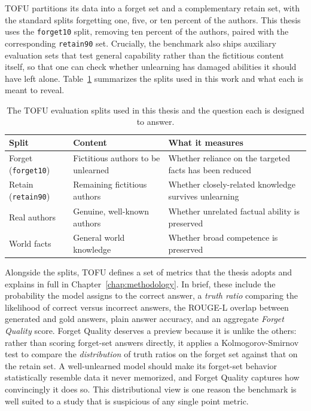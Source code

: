 \documentclass[a4paper,12pt]{report}
\begin{document}
TOFU partitions its data into a forget set and a complementary retain set, with the standard splits forgetting one, five, or ten percent of the authors. This thesis uses the \texttt{forget10} split, removing ten percent of the authors, paired with the corresponding \texttt{retain90} set. Crucially, the benchmark also ships auxiliary evaluation sets that test general capability rather than the fictitious content itself, so that one can check whether unlearning has damaged abilities it should have left alone. Table~\ref{tab:tofu-splits} summarizes the splits used in this work and what each is meant to reveal.

\begin{table}[htbp]
	\centering
	\caption{The TOFU evaluation splits used in this thesis and the question each is designed to answer.}
	\label{tab:tofu-splits}
	\begin{tabular}{p{3.0cm} p{4.0cm} p{6.0cm}}
		\toprule
		\textbf{Split} & \textbf{Content} & \textbf{What it measures} \\
		\midrule
		Forget (\texttt{forget10}) & Fictitious authors to be unlearned & Whether reliance on the targeted facts has been reduced \\
		Retain (\texttt{retain90}) & Remaining fictitious authors & Whether closely-related knowledge survives unlearning \\
		Real authors & Genuine, well-known authors & Whether unrelated factual ability is preserved \\
		World facts & General world knowledge & Whether broad competence is preserved \\
		\bottomrule
	\end{tabular}
\end{table}

Alongside the splits, TOFU defines a set of metrics that the thesis adopts and explains in full in Chapter~\ref{chap:methodology}. In brief, these include the probability the model assigns to the correct answer, a \emph{truth ratio} comparing the likelihood of correct versus incorrect answers, the ROUGE-L overlap between generated and gold answers, plain answer accuracy, and an aggregate \emph{Forget Quality} score. Forget Quality deserves a preview because it is unlike the others: rather than scoring forget-set answers directly, it applies a Kolmogorov-Smirnov test to compare the \emph{distribution} of truth ratios on the forget set against that on the retain set. A well-unlearned model should make its forget-set behavior statistically resemble data it never memorized, and Forget Quality captures how convincingly it does so. This distributional view is one reason the benchmark is well suited to a study that is suspicious of any single point metric.
\end{document}
